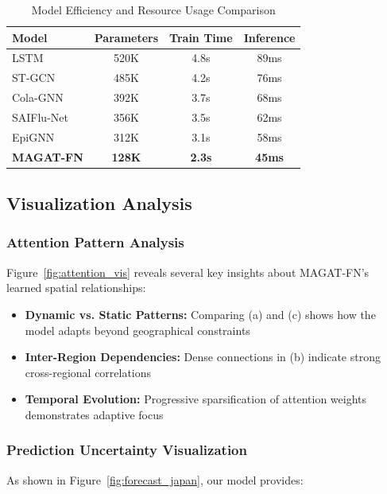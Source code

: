\documentclass[lettersize, journal]{IEEEtran}
\begin{document}
\begin{table}[htbp]
    \centering
    \caption{Model Efficiency and Resource Usage Comparison}
    \label{tab:efficiency}
    \begin{tabular}{lccc}
    \toprule
    \textbf{Model} & \textbf{Parameters} & \textbf{Train Time} & \textbf{Inference} \\
    \midrule
    LSTM & 520K & 4.8s & 89ms \\
    ST-GCN & 485K & 4.2s & 76ms \\
    Cola-GNN & 392K & 3.7s & 68ms \\
    SAIFlu-Net & 356K & 3.5s & 62ms \\
    EpiGNN & 312K & 3.1s & 58ms \\
    \textbf{MAGAT-FN} & \textbf{128K} & \textbf{2.3s} & \textbf{45ms} \\
    \bottomrule
    \end{tabular}
\end{table}


\subsection{Visualization Analysis}

\subsubsection{Attention Pattern Analysis}
Figure~\ref{fig:attention_vis} reveals several key insights about MAGAT-FN's learned spatial relationships:

\begin{itemize}
    \item \textbf{Dynamic vs. Static Patterns:} Comparing (a) and (c) shows how the model adapts beyond geographical constraints
    \item \textbf{Inter-Region Dependencies:} Dense connections in (b) indicate strong cross-regional correlations
    \item \textbf{Temporal Evolution:} Progressive sparsification of attention weights demonstrates adaptive focus
\end{itemize}

\subsubsection{Prediction Uncertainty Visualization}
As shown in Figure~\ref{fig:forecast_japan}, our model provides:
\end{document}
